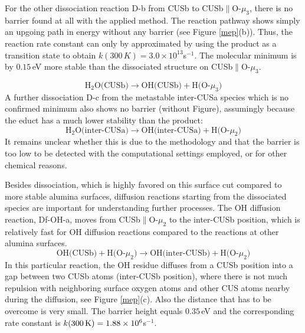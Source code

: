 \documentclass[11pt,DIV=13,BCOR=5mm,a4paper,headinclude]{scrbook}
\begin{document}
For the other dissociation reaction D-b from CUSb to CUSb$\parallel$O-$\mu_3$, there is no barrier found at all with the applied method.
The reaction pathway shows simply an upgoing path in energy without any barrier (see Figure \ref{mep}(b)).
Thus, the reaction rate constant can only by approximated by using the product as a transition state to obtain $k(300\,K)=3.0\times 10^{13}$s$^{-1}$.
The molecular minimum is by $0.15\,$eV more stable than the dissociated structure on CUSb$\parallel$O-$\mu_3$.

\begin{equation}
  \text{H$_2$O(CUSb)} \rightarrow \text{OH(CUSb)} + \text{H(O-$\mu_3$)} \tag{D-b}
      \label{dissb}
\end{equation}
A further dissociation D-c from the metastable inter-CUSa species which is no confirmed minimum also shows no barrier (without Figure), assumingly because the educt  has a much lower stability than the product:
\begin{equation}
  \text{H$_2$O(inter-CUSa)} \rightarrow \text{OH(inter-CUSa)} + \text{H(O-$\mu_2$)} \tag{D-c}
      \label{dissc}
\end{equation}
It remains unclear whether this is due to the methodology and that the barrier is too low to be detected with the computational settings employed, or for other chemical reasons.


Besides dissociation, which is highly favored on this surface cut compared to more stable alumina surfaces\cite{Heiden11-20_2018}, diffusion reactions starting from the dissociated species are important for understanding further processes.
The OH diffusion reaction, Df-OH-a, moves from CUSb$\parallel$O-$\mu_2$ to the inter-CUSb position, which is relatively fast for OH diffusion reactions compared to the reactions at other alumina surfaces\cite{WirthJPCC2012,Wirth2016}.
\begin{equation}
 \text{OH(CUSb)} + \text{H(O-$\mu_2$)} \rightarrow \text{OH(inter-CUSb)} + \text{H(O-$\mu_2$)} \tag{Df-OH-a}
     \label{diffOHa}
\end{equation}
In this particular reaction, the OH residue diffuses from a CUSb position into a gap between two CUSb atoms (inter-CUSb position), where there is not much repulsion with neighboring surface oxygen atoms and other CUS atoms nearby during the diffusion, see Figure \ref{mep}(c).
Also the distance that has to be overcome is very small.
The barrier height equals $0.35\,$eV and the corresponding rate constant is $k(\textrm{300\,K})=1.88\times 10^6$s$^{-1}$.
\end{document}
